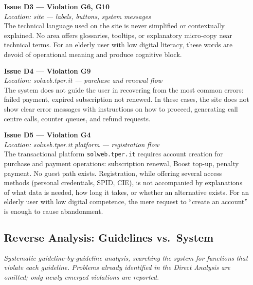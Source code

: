 ﻿\documentclass[11pt,a4paper]{article}
\begin{document}
\bigskip

\noindent\textbf{Issue D3 --- Violation G6, G10}\label{iss:D3}\\
\textit{Location: site --- labels, buttons, system messages}\\

\noindent The technical language used on the site is never simplified or contextually explained. No area offers glossaries, tooltips, or explanatory micro-copy near technical terms. For an elderly user with low digital literacy, these words are devoid of operational meaning and produce cognitive block.

\bigskip

\noindent\textbf{Issue D4 --- Violation G9}\label{iss:D4}\\
\textit{Location: solweb.tper.it --- purchase and renewal flow}\\

\noindent The system does not guide the user in recovering from the most common errors: failed payment, expired subscription not renewed. In these cases, the site does not show clear error messages with instructions on how to proceed, generating call centre calls, counter queues, and refund requests.

\bigskip

\noindent\textbf{Issue D5 --- Violation G4}\label{iss:D5}\\
\textit{Location: solweb.tper.it platform --- registration
flow}\\

\noindent The transactional platform \texttt{solweb.tper.it} requires
account creation for purchase and
payment operations: subscription renewal,
Boost top-up, penalty payment. No guest path exists.
Registration, while offering several access methods (personal
credentials, SPID, CIE), is not accompanied by explanations of what data
is needed, how long it takes, or whether an alternative exists. For an elderly
user with low digital competence, the mere request to ``create an
account'' is enough to cause abandonment.

\subsection*{Reverse Analysis: Guidelines vs.\ System}

\noindent\textit{Systematic guideline-by-guideline analysis, searching the system for functions that violate each guideline. Problems already identified in the Direct Analysis are omitted; only newly emerged violations are reported.}
\end{document}
